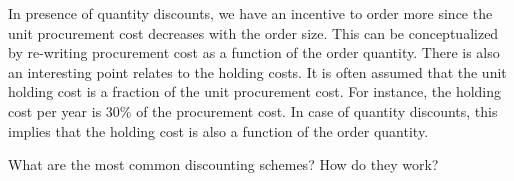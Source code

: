 \begin{solution}
In presence of quantity discounts, we have an incentive to order more since the unit procurement cost decreases with the order size. This can be conceptualized by re-writing procurement cost as a function of the order quantity. There is also an interesting point relates to the holding costs. It is often assumed that the unit holding cost is a fraction of the unit procurement cost. For instance, the holding cost per year is 30\% of the procurement cost. In case of quantity discounts, this implies that the holding cost is also a function of the order quantity. 
\end{solution}

\begin{question}
What are the most common discounting schemes? How do they work?
\end{question}

